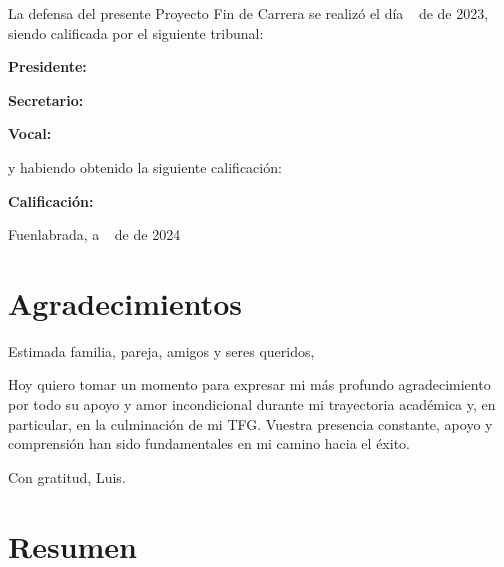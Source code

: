 \documentclass[a4paper, 12pt]{book}
\begin{document}
	\vspace{1cm}
	La defensa del presente Proyecto Fin de Carrera se realizó el día \qquad$\;\,$ de \qquad\qquad\qquad\qquad \newline de 2023, siendo calificada por el siguiente tribunal:
	
	
	\vspace{0.5cm}
	\textbf{Presidente:}
	
	\vspace{1.2cm}
	\textbf{Secretario:}
	
	\vspace{1.2cm}
	\textbf{Vocal:}
	
	
	\vspace{1.2cm}
	y habiendo obtenido la siguiente calificación:
	
	\vspace{1cm}
	\textbf{Calificación:}
	
	
	\vspace{1cm}
	\begin{flushright}
		Fuenlabrada, a \qquad$\;\,$ de \qquad\qquad\qquad\qquad de 2024
	\end{flushright}
	
	
	
	\chapter*{Agradecimientos}
	
	Estimada familia, pareja, amigos y seres queridos,
	
	Hoy quiero tomar un momento para expresar mi más profundo agradecimiento por todo su apoyo y amor incondicional durante mi trayectoria académica y, en particular, en la culminación de mi TFG. Vuestra presencia constante, apoyo y comprensión han sido fundamentales en mi camino hacia el éxito.
	
	
	Con gratitud,
	Luis.
	
	
	\chapter*{Resumen}
	
\end{document}
